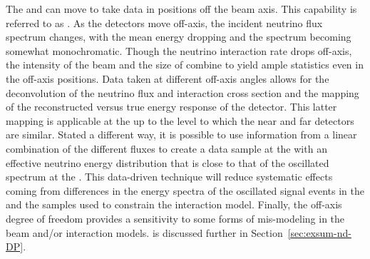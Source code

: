 The  and  can move to take data in positions off the beam axis.  This capability is referred to as . As the detectors move off-axis, the incident neutrino flux spectrum changes, with the mean energy dropping and the spectrum becoming somewhat monochromatic.  Though the neutrino interaction rate drops off-axis, the intensity of the beam and the size of   combine to yield ample statistics even in the off-axis positions.
Data taken at different off-axis angles allows for the deconvolution of the neutrino flux and interaction cross section and the mapping of the reconstructed versus true energy response of the detector.  This latter mapping is applicable at the  up to the level to which the near and far  detectors are similar.  Stated a different way, it is possible to use information from a linear combination of the different fluxes to create a data sample at the  with an effective neutrino energy distribution that is close to that of the oscillated spectrum at the .  This data-driven technique will reduce systematic effects coming from differences in the energy spectra of the oscillated signal events in the  and the  samples used to constrain the interaction model. Finally, the off-axis degree of freedom provides a sensitivity to some forms of mis-modeling in the beam and/or interaction models.  is discussed further in Section~\ref{sec:exsum-nd-DP}.

